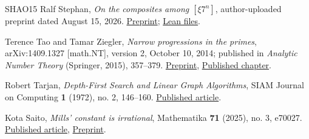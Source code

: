 \documentclass[11pt,reqno]{amsart}
\theoremstyle{definition}
\theoremstyle{remark}
\begin{document}
\begin{thebibliography}{SHAO15}
\label{ref-s26}
Ralf Stephan, \emph{On the composites among \([\xi 7^n]\)}, author-uploaded
preprint dated August 15, 2026.
\href{https://www.researchgate.net/publication/412294027_On_the_composites_among_x7}{Preprint};
\href{https://github.com/rwst/On-Composites}{Lean files}.

\label{ref-tz14}
Terence Tao and Tamar Ziegler, \emph{Narrow progressions in the
primes}, arXiv:1409.1327 {[}math.NT{]}, version 2, October 10, 2014;
published in \emph{Analytic Number Theory} (Springer, 2015), 357--379.
\href{https://arxiv.org/abs/1409.1327v2}{Preprint},
\href{https://doi.org/10.1007/978-3-319-22240-0_22}{Published chapter}.

\label{ref-t}
Robert Tarjan, \emph{Depth-First Search and Linear Graph Algorithms},
SIAM Journal on Computing \textbf{1} (1972), no. 2, 146--160.
\href{https://doi.org/10.1137/0201010}{Published article}.

\label{ref-sa25}
Kota Saito, \emph{Mills' constant is irrational},
Mathematika \textbf{71} (2025), no. 3, e70027.
\href{https://doi.org/10.1112/mtk.70027}{Published article},
\href{https://arxiv.org/abs/2404.19461}{Preprint}.

\end{thebibliography}
\end{document}
